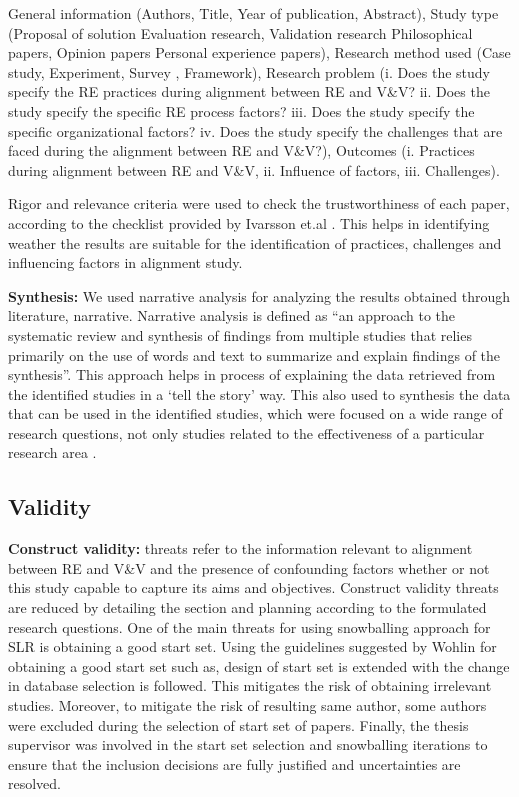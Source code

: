 \documentclass{article}
\begin{document}
General information (Authors, Title, Year of publication, Abstract), Study type (Proposal of solution Evaluation research, Validation research Philosophical papers, Opinion papers
Personal experience papers), Research method used (Case study,  Experiment,  Survey ,  Framework), Research problem (i. Does the study specify the RE practices during alignment between RE and V\&V? ii.	Does the study specify the specific RE process factors? iii.	Does the study specify the specific organizational factors? iv.	Does the study specify the challenges that are faced during the alignment between RE and V\&V?), Outcomes (i.	Practices during alignment between RE and V\&V, ii.	Influence of factors, iii.	Challenges).


Rigor and relevance criteria were used to check the trustworthiness of each paper, according to the checklist provided by Ivarsson et.al \cite{ivarsson2011method}. This helps in identifying weather the results are suitable for the identification of practices, challenges and influencing factors in alignment study.


\textbf{Synthesis:} We used narrative analysis for analyzing the results obtained through literature, narrative. Narrative analysis is defined as “an approach to the systematic review and synthesis of findings from multiple studies that relies primarily on the use of words and text to summarize and explain findings of the synthesis”. This approach helps in process of explaining the data retrieved from the identified studies in a ‘tell the story’ way. This also used to synthesis the data that can be used in the identified studies, which were focused on a wide range of research questions, not only studies related to the effectiveness of a particular research area \cite{popay2006guidance}.


\subsection{Validity}


\textbf{Construct validity:} threats refer to the information relevant to alignment between RE and V\&V and the presence of confounding factors whether or not this study capable to capture its aims and objectives. Construct validity threats are reduced by detailing the section and planning according to the formulated research questions. One of the main threats for using snowballing approach for SLR is obtaining a good start set. Using the guidelines suggested by Wohlin \cite{wohlin2014guidelines} for obtaining a good start set such as, design of start set is extended with the change in database selection is followed. This mitigates the risk of obtaining irrelevant studies. Moreover, to mitigate the risk of resulting same author, some authors were excluded during the selection of start set of papers. Finally, the thesis supervisor was involved in the start set selection and snowballing iterations to ensure that the inclusion decisions are fully justified and uncertainties are resolved.
\end{document}
